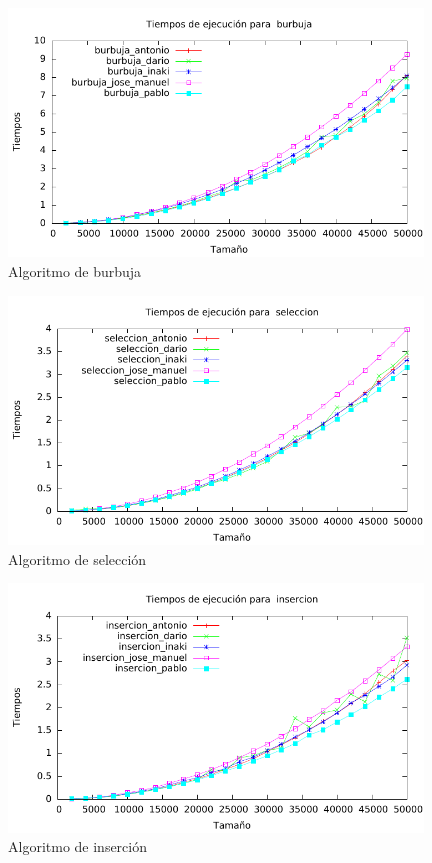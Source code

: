 \documentclass[a4paper, 11pt]{article}
\begin{document}
\begin{figure}[h] \includegraphics[width=11cm]{burbuja_todos_g} \centering
      \caption{Algoritmo de burbuja} \end{figure}

\begin{figure}[h] \includegraphics[width=11cm]{seleccion_todos_g} \centering
      \caption{Algoritmo de selección} \end{figure}

\begin{figure}[h] \includegraphics[width=11cm]{insercion_todos_g} \centering
      \caption{Algoritmo de inserción} \end{figure}
\end{document}
